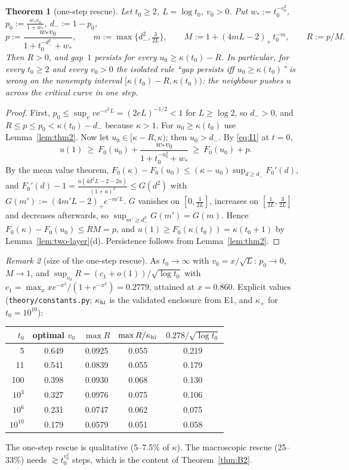 \documentclass[11pt]{article}
\newtheorem{theorem}{Theorem}[section]
\theoremstyle{definition}
\theoremstyle{remark}
\newtheorem{remark}[theorem]{Remark}
\begin{document}
\begin{theorem}[one-step rescue]\label{thm:B1}
Let $t_0\ge2$, $L=\log t_0$, $v_0>0$. Put $w_*:=t_0^{-v_0^2}$, $p_0:=\frac{w_*v_0}{1+w_*}$, $d_-:=1-p_0$,
\[
p:=\frac{w_*v_0}{1+t_0^{-d_-^2}+w_*},\qquad m:=\max\{d_-^2,\tfrac3{2L}\},\qquad
M:=1+(4mL-2)_+\,t_0^{-m},\qquad R:=p/M .
\]
Then $R>0$, and gap~$1$ persists for \emph{every} $u_0\ge\kappa(t_0)-R$. In particular, for every $t_0\ge2$
and every $v_0>0$ the isolated rule ``gap persists iff $u_0\ge\kappa(t_0)$'' is wrong on the nonempty
interval $[\kappa(t_0)-R,\kappa(t_0))$: the neighbour pushes $u$ across the critical curve in one step.
\end{theorem}
\begin{proof}
First, $p_0\le\sup_vve^{-v^2L}=(2eL)^{-1/2}<1$ for $L\ge\log2$, so $d_->0$, and $R\le p\le p_0<\kappa(t_0)-d_-$
because $\kappa>1$. For $u_0\ge\kappa(t_0)$ use Lemma~\ref{lem:thm2}. Now let
$u_0\in[\kappa-R,\kappa)$; then $u_0>d_-$. By \eqref{eq:I1} at $t=0$,
\[
u(1)\ \ge\ F_0(u_0)+\frac{w_*v_0}{1+t_0^{-u_0^2}+w_*}\ \ge\ F_0(u_0)+p .
\]
By the mean value theorem, $F_0(\kappa)-F_0(u_0)\le(\kappa-u_0)\sup_{d\ge d_-}F_0'(d)$, and
$F_0'(d)-1=\frac{a(4d^2L-2-2a)}{(1+a)^2}\le G(d^2)$ with $G(m'):=(4m'L-2)_+e^{-m'L}$. $G$ vanishes on
$[0,\frac1{2L}]$, increases on $[\frac1{2L},\frac3{2L}]$ and decreases afterwards, so
$\sup_{m'\ge d_-^2}G(m')=G(m)$. Hence $F_0(\kappa)-F_0(u_0)\le RM=p$, and
$u(1)\ge F_0(\kappa(t_0))=\kappa(t_0+1)$ by Lemma~\ref{lem:two-layer}(d). Persistence follows from Lemma~\ref{lem:thm2}.
\end{proof}

\begin{remark}[size of the one-step rescue]
As $t_0\to\infty$ with $v_0=x/\sqrt L$: $p_0\to0$, $M\to1$, and
$\sup_{v_0}R=(c_1+o(1))/\sqrt{\log t_0}$ with $c_1=\max_xxe^{-x^2}/(1+e^{-x^2})=0.2779$, attained at
$x=0.860$. Explicit values (\texttt{theory/constants.py}; $\kappa_{\rm hi}$ is the validated enclosure from E1, and
$\kappa_+$ for $t_0=10^{10}$):
\begin{center}
\begin{tabular}{rcccc}
\toprule
$t_0$ & optimal $v_0$ & $\max R$ & $\max R/\kappa_{\rm hi}$ & $0.278/\sqrt{\log t_0}$\\
\midrule
5 & 0.649 & 0.0925 & 0.055 & 0.219\\
11 & 0.541 & 0.0839 & 0.055 & 0.179\\
100 & 0.398 & 0.0930 & 0.068 & 0.130\\
$10^3$ & 0.327 & 0.0976 & 0.075 & 0.106\\
$10^6$ & 0.231 & 0.0747 & 0.062 & 0.075\\
$10^{10}$ & 0.179 & 0.0579 & 0.051 & 0.058\\
\bottomrule
\end{tabular}
\end{center}
The one-step rescue is qualitative (5--7.5\% of $\kappa$). The macroscopic rescue (25--33\%) needs
$\gtrsim t_0^{v_0^2}$ steps, which is the content of Theorem~\ref{thm:B2}.
\end{remark}
\end{document}
